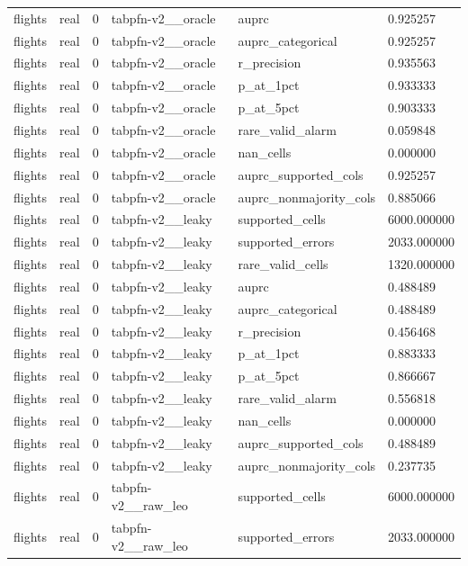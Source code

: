\begin{tabular}{llllll}
flights & real & 0 & tabpfn-v2\_\_oracle & auprc & 0.925257 \\
flights & real & 0 & tabpfn-v2\_\_oracle & auprc\_categorical & 0.925257 \\
flights & real & 0 & tabpfn-v2\_\_oracle & r\_precision & 0.935563 \\
flights & real & 0 & tabpfn-v2\_\_oracle & p\_at\_1pct & 0.933333 \\
flights & real & 0 & tabpfn-v2\_\_oracle & p\_at\_5pct & 0.903333 \\
flights & real & 0 & tabpfn-v2\_\_oracle & rare\_valid\_alarm & 0.059848 \\
flights & real & 0 & tabpfn-v2\_\_oracle & nan\_cells & 0.000000 \\
flights & real & 0 & tabpfn-v2\_\_oracle & auprc\_supported\_cols & 0.925257 \\
flights & real & 0 & tabpfn-v2\_\_oracle & auprc\_nonmajority\_cols & 0.885066 \\
flights & real & 0 & tabpfn-v2\_\_leaky & supported\_cells & 6000.000000 \\
flights & real & 0 & tabpfn-v2\_\_leaky & supported\_errors & 2033.000000 \\
flights & real & 0 & tabpfn-v2\_\_leaky & rare\_valid\_cells & 1320.000000 \\
flights & real & 0 & tabpfn-v2\_\_leaky & auprc & 0.488489 \\
flights & real & 0 & tabpfn-v2\_\_leaky & auprc\_categorical & 0.488489 \\
flights & real & 0 & tabpfn-v2\_\_leaky & r\_precision & 0.456468 \\
flights & real & 0 & tabpfn-v2\_\_leaky & p\_at\_1pct & 0.883333 \\
flights & real & 0 & tabpfn-v2\_\_leaky & p\_at\_5pct & 0.866667 \\
flights & real & 0 & tabpfn-v2\_\_leaky & rare\_valid\_alarm & 0.556818 \\
flights & real & 0 & tabpfn-v2\_\_leaky & nan\_cells & 0.000000 \\
flights & real & 0 & tabpfn-v2\_\_leaky & auprc\_supported\_cols & 0.488489 \\
flights & real & 0 & tabpfn-v2\_\_leaky & auprc\_nonmajority\_cols & 0.237735 \\
flights & real & 0 & tabpfn-v2\_\_raw\_leo & supported\_cells & 6000.000000 \\
flights & real & 0 & tabpfn-v2\_\_raw\_leo & supported\_errors & 2033.000000 \\

\end{tabular}
